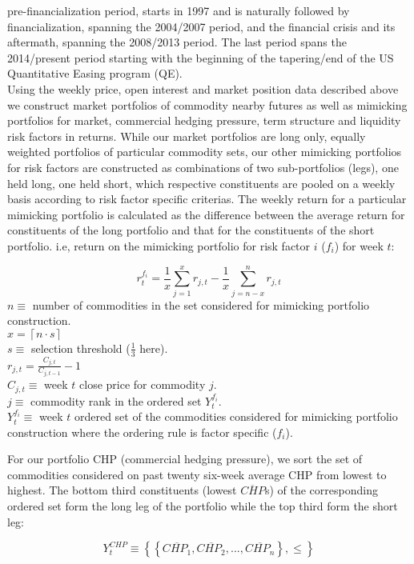 \documentclass[12pt,]{article}
\begin{document}
pre-financialization period, starts in 1997 and is naturally followed by
financialization, spanning the 2004/2007 period, and the financial
crisis and its aftermath, spanning the 2008/2013 period. The last period
spans the 2014/present period starting with the beginning of the
tapering/end of the US Quantitative Easing program (QE).\\
Using the weekly price, open interest and market position data described
above we construct market portfolios of commodity nearby futures as well
as mimicking portfolios for market, commercial hedging pressure, term
structure and liquidity risk factors in returns. While our market
portfolios are long only, equally weighted portfolios of particular
commodity sets, our other mimicking portfolios for risk factors are
constructed as combinations of two sub-portfolios (legs), one held long,
one held short, which respective constituents are pooled on a weekly
basis according to risk factor specific criterias. The weekly return for
a particular mimicking portfolio is calculated as the difference between
the average return for constituents of the long portfolio and that for
the constituents of the short portfolio. i.e, return on the mimicking
portfolio for risk factor \(i\) (\(f_{i}\)) for week \(t\):

\[r_{t}^{f_{i}}=\frac{1}{x}\sum_{j=1}^{x}r_{j,t}-\frac{1}{x}\sum_{j=n-x}^{n}r_{j,t}\]
\(n\equiv\) number of commodities in the set considered for mimicking
portfolio construction.\\
\(x = \left \lceil n \cdot s \right \rceil\)\\
\(s\equiv\) selection threshold (\(\frac{1}{3}\) here).\\
\(r_{j,t}=\frac{C_{j,t}}{C_{j,t-1}}-1\)\\
\(C_{j,t}\equiv\) week \(t\) close price for commodity \(j\).\\
\(j\equiv\) commodity rank in the ordered set \(Y_{t}^{f_{i}}\).\\
\(Y_{t}^{f_{i}}\equiv\) week \(t\) ordered set of the commodities
considered for mimicking portfolio construction where the ordering rule
is factor specific (\(f_{i}\)).

For our portfolio CHP (commercial hedging pressure), we sort the set of
commodities considered on past twenty six-week average CHP from lowest
to highest. The bottom third constituents (lowest \(\overline{CHP}\)s)
of the corresponding ordered set form the long leg of the portfolio
while the top third form the short leg:

\[Y_{t}^{CHP}\equiv\left \{ \left \{ \overline{CHP_{1}}, \overline{CHP_{2}}, ..., \overline{CHP_{n}} \right \}, \leq \right \}\]
\end{document}
